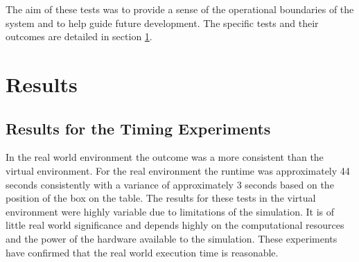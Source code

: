 \documentclass[letterpaper, 10 pt, conference]{conf/ieeeconf}  %
\begin{document}
The aim of these tests was to provide a sense of the operational boundaries of
the system and to help guide future development.
The specific tests and their outcomes are detailed in section \ref{sec:results}.


\section{Results}
\label{sec:results}

\subsection{Results for the Timing Experiments}
In the real world environment the outcome was a more consistent than the virtual
environment. For the real environment the runtime was approximately 44 seconds
consistently with a variance of approximately 3 seconds based on the position of
the box on the table. The results for these tests in the virtual environment
were highly variable due to limitations of the simulation. It is of little
real world significance and depends highly on the computational resources and
the power of the hardware available to the simulation. These experiments have
confirmed that the real world execution time is reasonable.
\end{document}
